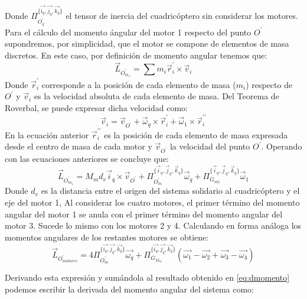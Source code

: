 \documentclass[main]{subfiles}
\begin{document}
Donde  $\Pi_{O^\prime_q}^{\{\vec{i_q}, \vec{j_q}, \vec{k_q}\}}$ el tensor de inercia del cuadric\'optero sin considerar los motores.\\

Para el c\'alculo del momento \'angular del motor 1 respecto del punto $O^\prime$ supondremos, por simplicidad, que el motor se compone de elementos de masa discretos. En este caso, por definici\'on de momento angular tenemos que:
\begin{equation}
\vec{L}_{O^\prime_{m_1}} = \sum m_i\vec{r}_i^\prime \times \vec{v}_i
\end{equation}
Donde $\vec{r}_i^\prime$ corresponde a la posici\'on de cada elemento de masa ($m_i$) respecto de $O^\prime$ y $\vec{v}_i$ es la velocidad absoluta de cada elemento de masa. Del Teorema de Roverbal, se puede expresar dicha velocidad como:
\begin{equation}
\vec{v}_i = \vec{v}_{O^\prime} + \vec{\omega}_q \times \vec{r}_i^\prime + \vec{\omega}_1 \times \vec{r}_i^{\prime\prime}
\end{equation}
En la ecuaci\'on anterior $\vec{r}_i^{\prime\prime}$ es la posici\'on de cada elemento de masa expresada desde el centro de masa de cada motor y $\vec{v}_{O^\prime}$ la velocidad del punto $O^\prime$. Operando con las ecuaciones anteriores se concluye que:
\begin{equation}
\vec{L}_{O^\prime_{m_1}} = M_m d_v\vec{i}_q\times \vec{v}_{O^\prime} +\Pi_{O^\prime_m}^{\{\vec{i}_q, \vec{j}_q, \vec{k}_q\}}\vec{\omega}_q+ \Pi_{G_{m1}}^{\{\vec{i}_q, \vec{j}_q, \vec{k}_q\}}\vec{\omega}_1
\end{equation}
Donde $d_v$ es la distancia entre el origen del sistema solidario al cuadric\'optero y el eje del motor 1, Al considerar los cuatro motores, el primer t\'ermino del momento angular del motor 1 se anula con el primer t\'ermino del momento angular del motor 3. Sucede lo mismo con los motores 2 y 4.
Calculando en forma an\'aloga los momentos angulares de los restantes motores se obtiene:
\begin{equation}
\vec{L}_{O^\prime_{motores}}=4\Pi_{O^\prime_m}^{\{\vec{i_q}, \vec{j_q}, \vec{k_q}\}}\vec{\omega_q}+\Pi_{G_{M_{m}}}^{\{\vec{i_q}, \vec{j_q}, \vec{k_q}\}}(\vec{\omega_1}-\vec{\omega_2}+\vec{\omega_3}-\vec{\omega_4})
\end{equation}

Derivando esta expresi\'on y sum\'andola al resultado obtenido en \ref{eq:dmomento} podemos escribir la derivada del momento angular del sistema como:
\end{document}
